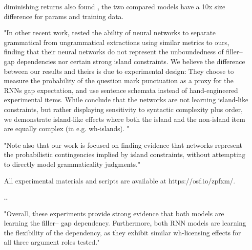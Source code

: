 




diminishing returns also found \citep{wilcox2018rnn}, the two compared models have a 10x size difference for params and training data.

"In other recent work, \citet{chowdhury2018rnn} tested the ability of neural networks
to separate grammatical from ungrammatical extractions using similar metrics to ours, finding that their neural networks do not represent the unboundedness of filler–gap dependencies nor certain strong island constraints. We believe the difference between our results and theirs is due to experimental design: They choose to measure the probability of the question mark punctuation as a proxy for the RNNs gap expectation, and use sentence schemata instead of hand-engineered experimental items. While \citet{chowdhury2018rnn} conclude that the networks are not learning island-like constraints, but rather displaying sensitivity to syntactic complexity plus order, we demonstrate island-like effects where both the island and the non-island item are equally complex (in e.g. wh-islands). " \citep{wilcox2018rnn}

"Note also that our work is focused on finding evidence that networks represent the probabilistic contingencies implied by island constraints, without attempting to directly model grammaticality judgments."  \citep{wilcox2018rnn}

All experimental materials and scripts are available at https://osf.io/zpfxm/. \citep{wilcox2018rnn}

..

"Overall, these experiments provide strong
evidence that both models are learning the filler–
gap dependency. Furthermore, both RNN models
are learning the flexibility of the dependency, as
they exhibit similar wh-licensing effects for all
three argument roles tested." \citep{wilcox2018rnn}

